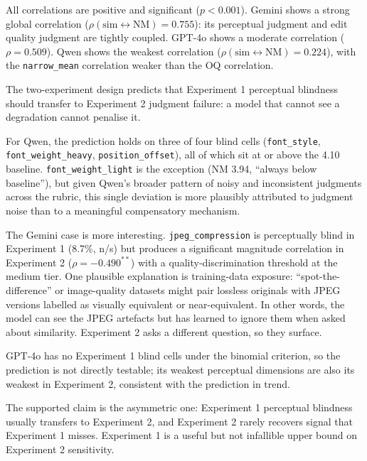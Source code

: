 All correlations are positive and significant ($p < 0.001$). Gemini shows a strong global correlation ($\rho(\text{sim} \leftrightarrow \text{NM}) = 0.755$): its perceptual judgment and edit quality judgment are tightly coupled. GPT-4o shows a moderate correlation ($\rho = 0.509$). Qwen shows the weakest correlation ($\rho(\text{sim} \leftrightarrow \text{NM}) = 0.224$), with the \texttt{narrow\_mean} correlation weaker than the OQ correlation.

The two-experiment design predicts that Experiment 1 perceptual blindness should transfer to Experiment 2 judgment failure: a model that cannot see a degradation cannot penalise it.

For Qwen, the prediction holds on three of four blind cells (\texttt{font\_style}, \texttt{font\_weight\_heavy}, \texttt{position\_offset}), all of which sit at or above the 4.10 baseline. \texttt{font\_weight\_light} is the exception (NM 3.94, ``always below baseline''), but given Qwen's broader pattern of noisy and inconsistent judgments across the rubric, this single deviation is more plausibly attributed to judgment noise than to a meaningful compensatory mechanism.

The Gemini case is more interesting. \texttt{jpeg\_compression} is perceptually blind in Experiment 1 (8.7\%, n/s) but produces a significant magnitude correlation in Experiment 2 ($\rho = -0.490^{**}$) with a quality-discrimination threshold at the medium tier. One plausible explanation is training-data exposure: ``spot-the-difference'' or image-quality datasets might pair lossless originals with JPEG versions labelled as visually equivalent or near-equivalent. In other words, the model can see the JPEG artefacts but has learned to ignore them when asked about similarity. Experiment 2 asks a different question, so they surface.

GPT-4o has no Experiment 1 blind cells under the binomial criterion, so the prediction is not directly testable; its weakest perceptual dimensions are also its weakest in Experiment 2, consistent with the prediction in trend.

The supported claim is the asymmetric one: Experiment 1 perceptual blindness usually transfers to Experiment 2, and Experiment 2 rarely recovers signal that Experiment 1 misses. Experiment 1 is a useful but not infallible upper bound on Experiment 2 sensitivity.
